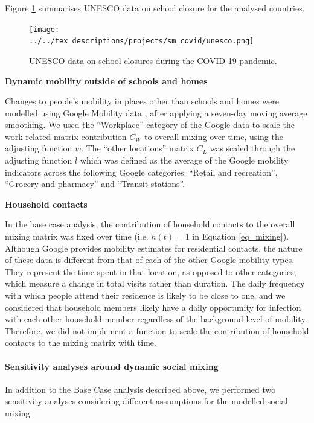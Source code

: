 Figure \ref{fig:unesco} summarises UNESCO data on school closure for the analysed countries.

\begin{figure}[p]
  \begin{center}
  \texttt{[image: ../../tex\_descriptions/projects/sm\_covid/unesco.png]}
  \end{center}
  \caption{UNESCO data on school closures during the COVID-19 pandemic.
  } 
  \label{fig:unesco}
\end{figure}

\vspace{5pt}
\textbf{Dynamic mobility outside of schools and homes}

Changes to people's mobility in places other than schools and homes were modelled using Google Mobility data \cite{googlemob2023}, after applying a seven-day moving average smoothing. We used the ``Workplace''
category of the Google data to scale the work-related matrix contribution $C_W$ to overall mixing over time, using the adjusting function
$w$. The ``other locations'' matrix $C_L$ was scaled through the adjusting function $l$ which was defined as the average of the Google mobility
indicators across the following Google categories: ``Retail and recreation'', ``Grocery and pharmacy'' and ``Transit stations''.

\vspace{5pt}
\textbf{Household contacts}

In the base case analysis, the contribution of household contacts to the overall mixing matrix was fixed over time 
(i.e. $h(t) = 1$ in Equation \ref{eq_mixing}). Although Google provides mobility 
estimates for residential contacts, the nature of these data is different from that of each of the other Google mobility 
types. They represent the time spent in that location, as opposed to other categories, which measure a change in total visits 
rather than duration. The daily frequency with which people attend their residence is likely to be close to one, and we 
considered that household members likely have a daily opportunity for infection with each other household member regardless of
the background level of mobility. Therefore, we did not implement a function to scale the contribution of household contacts 
to the mixing matrix with time.

\paragraph{Sensitivity analyses around dynamic social mixing}
In addition to the Base Case analysis described above, we performed two sensitivity analyses considering
different assumptions for the modelled social mixing.

